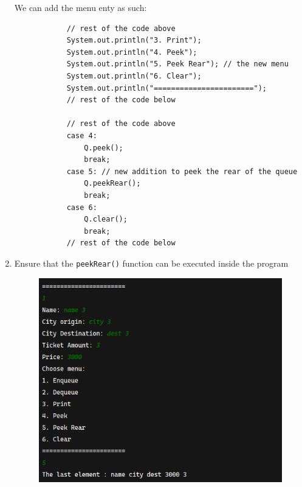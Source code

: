 \documentclass[12pt,titlepage]{article}
\begin{document}
\begin{enumerate}
{        We can add the menu enty as such:
        
        \begin{verbatim}
            // rest of the code above
            System.out.println("3. Print");
            System.out.println("4. Peek");
            System.out.println("5. Peek Rear"); // the new menu
            System.out.println("6. Clear");
            System.out.println("=======================");
            // rest of the code below

            // rest of the code above
            case 4:
                Q.peek();
                break;
            case 5: // new addition to peek the rear of the queue
                Q.peekRear();
                break;
            case 6:
                Q.clear();
                break;
            // rest of the code below
        \end{verbatim}
    }
    \item {
        Ensure that the \texttt{peekRear()} function can be executed inside the program

        \begin{figure}[h]
            \centering
            \includegraphics[width=.8\textwidth]{./images/peek_rear_output.png}
        \end{figure}
    }
\end{enumerate}
\end{document}
